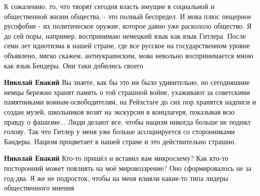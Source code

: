 \begin{itemize}
 

К сожалению, то, что творят сегодня власть имущие в социальной и общественной
жизни общества, - это полный беспредел. И мова плюс пещерное русофобие - их
политическое оружие, которое давно уже раскололо общество. Я до сей поры,
например, воспринимаю немецкий язык как язык Гитлера. После семи лет идиотизма
в нашей стране, где все русское на государственном уровне объявлено, мягко
скажем, антиукраинским, мова невольно воспринимается мною как язык Бендеры. Они
таки добились своего

\begin{itemize}
 
\textbf{Николай Енакий} Вы знаете, как бы это ни было удивительно, но сегодняшние немцы бережно хранят память о той страшной войне, ухаживают за советскими памятниками воинам-освободителям, на Рейхстаге до сих пор хранятся надписи и создан музей, школьников возят на экскурсии в концлагеря, показывая всю правду о фашизме... Люди делают все, чтобы нацизм никогда больше не поднял голову. Так что Гитлер у меня уже больше ассоциируется со сторонниками Бандеры. Нацизм процветает в нашей стране и это действительно страшно.

 
\textbf{Николай Енакий} Кто-то пришёл и вставил вам микросхему? Как кто-то посторонний может повлиять на моё мировоззрение? Оно сформировалось не за год-два. Я же не подросток, чтобы на меня влияли какие-то типа лидеры общественного мнения

 

\end{itemize}
\end{itemize}
